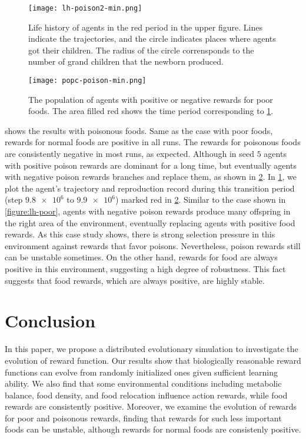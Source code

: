 \begin{figure}[!htb]
  \centering
  \texttt{[image: lh-poison2-min.png]}
  \caption{
    Life history of agents in the red period in the upper figure.
    Lines indicate the trajectories, and the circle indicates places where agents got their children.
    The radius of the circle corrensponds to the number of grand children that the newborn produced.
  }\label{figure:lh-poison}
\end{figure}

\begin{figure}[!htb]
  \centering
  \texttt{[image: popc-poison-min.png]}
  \caption{
    The population of agents with positive or negative rewards for poor foods.
    The area filled red shows the time period corresponding to \cref{figure:lh-poison}.
  }\label{figure:pop-poison}
\end{figure}

 shows the results with poisonous foods. Same as the case with poor foods, rewards for normal foods are positive in all runs. The rewards for poisonous foods are consistently negative in most runs, as expected. Although in seed $5$ agents with positive poison rewards are dominant for a long time, but eventually agents with negative poison rewards branches and replace them, as shown in \cref{figure:pop-poison}. In \cref{figure:lh-poison}, we plot the agent's trajectory and reproduction record during this transition period (step $\num{9.8e6}$ to $\num{9.9e6}$) marked red in \cref{figure:pop-poison}. Similar to the case shown in \cref{figure:lh-poor}, agents with negative poison rewards produce many offspring in the right area of the environment, eventually replacing agents with positive food rewards. As this case study shows, there is strong selection pressure in this environment against rewards that favor poisons. Nevertheless, poison rewards still can be unstable sometimes. On the other hand, rewards for food are always positive in this environment, suggesting a high degree of robustness. This fact suggests that food rewards, which are always positive, are highly stable.

\section{Conclusion}
In this paper, we propose a distributed evolutionary simulation to investigate the evolution of reward function.
Our results show that biologically reasonable reward functions can evolve from randomly initialized ones given sufficient learning ability.
We also find that some environmental conditions including metabolic balance, food density, and food relocation influence action rewards, while food rewards are consistently positive.
Moreover, we examine the evolution of rewards for poor and poisonous rewards, finding that rewards for such less important foods can be unstable, although rewards for normal foods are consistenly positive.
